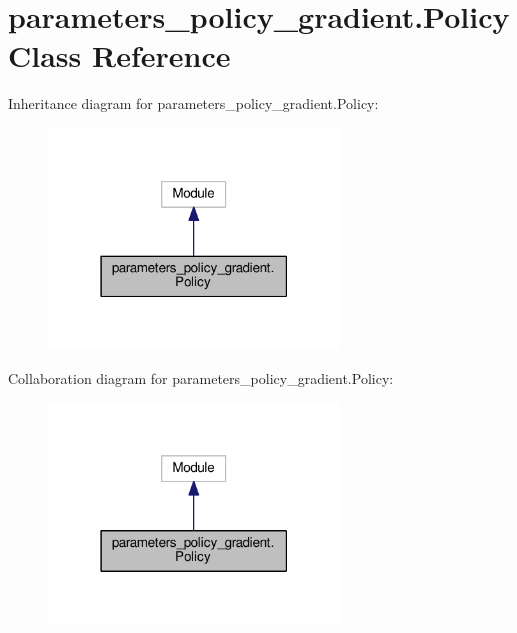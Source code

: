 \hypertarget{classparameters__policy__gradient_1_1_policy}{}\section{parameters\+\_\+policy\+\_\+gradient.\+Policy Class Reference}
\label{classparameters__policy__gradient_1_1_policy}


Inheritance diagram for parameters\+\_\+policy\+\_\+gradient.\+Policy\+:
\nopagebreak
\begin{figure}[H]
\begin{center}
\leavevmode
\includegraphics[width=219pt]{classparameters__policy__gradient_1_1_policy__inherit__graph}
\end{center}
\end{figure}


Collaboration diagram for parameters\+\_\+policy\+\_\+gradient.\+Policy\+:
\nopagebreak
\begin{figure}[H]
\begin{center}
\leavevmode
\includegraphics[width=219pt]{classparameters__policy__gradient_1_1_policy__coll__graph}
\end{center}
\end{figure}
